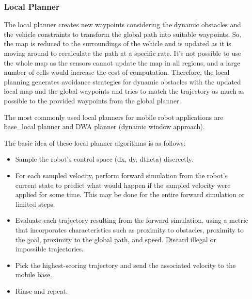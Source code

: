 \documentclass[12pt]{article}
\begin{document}
\subsubsection{Local Planner}
\par The local planner creates new waypoints considering the dynamic obstacles and the vehicle constraints to transform the global path into suitable waypoints. So, the map is reduced to the surroundings of the vehicle and is updated as it is moving around to recalculate the path at a specific rate. It's not possible to use the whole map as the sensors cannot update the map in all regions, and a large number of cells would increase the cost of computation. Therefore, the local planning generates avoidance strategies for dynamic obstacles with the updated local map and the global waypoints and tries to match the trajectory as much as possible to the provided waypoints from the global planner. 
\par The most commonly used local planners for mobile robot applications are base\_local planner and DWA planner (dynamic window approach).
\par The basic idea of these local planner algorithms is as follows:
\begin{itemize}
    \item Sample the robot's control space (dx, dy, dtheta) discreetly. 
    \item For each sampled velocity, perform forward simulation from the robot's current state to predict what would happen if the sampled velocity were applied for some time. This may be done for the entire forward simulation or limited steps.
    \item Evaluate each trajectory resulting from the forward simulation, using a metric that incorporates characteristics such as proximity to obstacles, proximity to the goal, proximity to the global path, and speed. Discard illegal or impossible trajectories.
    \item Pick the highest-scoring trajectory and send the associated velocity to the mobile base.
    \item Rinse and repeat.
\end{itemize}
\end{document}
